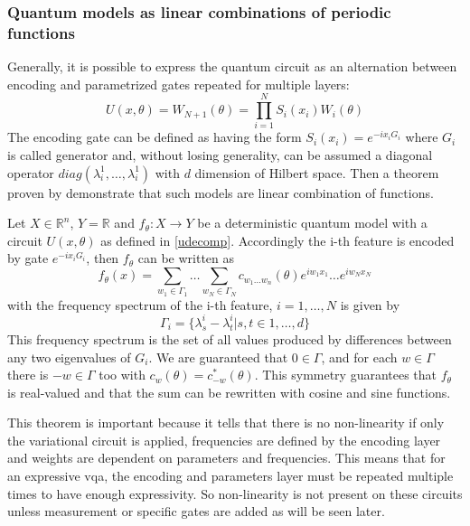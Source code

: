 \subsubsection{Quantum models as linear combinations of periodic functions}
Generally, it is possible to express the quantum circuit as an alternation between encoding and parametrized gates repeated for multiple layers:
\begin{equation}\label{udecomp}
	U(x,\theta) = W_{N+1}(\theta) = \prod_{i = 1}^{N} S_i(x_i)W_i(\theta)
\end{equation}
The encoding gate can be defined as having the form $S_i(x_i) = e^{-i x_i G_i} $ where $G_i$ is called generator and, without losing generality, can be assumed a diagonal operator $diag(\lambda_{i}^{1}, \dots, \lambda_{i}^{1} )$ with $d$ dimension of Hilbert space. Then a theorem proven by \cite{Schuld_theorem} demonstrate that such models are linear combination of functions.
\begin{theorem}
	Let $X \in \mathbb{R}^n$, $Y = \mathbb{R}$ and $f_\theta:X \to Y$ be a deterministic quantum model with a circuit $U(x,\theta)$ as defined in \ref{udecomp}. Accordingly the i-th  feature is encoded by gate $ e^{-i x_i G_i}$, then $f_\theta$ can be written as 
	\begin{equation*}
		f_\theta(x) = \sum_{w_1 \in \Gamma_1} \dots \sum_{w_N \in \Gamma_N} c_{w_1 \dots w_n}(\theta) e^{iw_1 x_1} \dots e^{iw_N x_N}
	\end{equation*}
	with the frequency spectrum of the i-th feature, $i=1,\dots,N$ is given by 
	\begin{equation*}
		\Gamma_i = \{\lambda_{s}^{i} - \lambda_{t}^{i} | s, t \in {1, \dots,d} \}
	\end{equation*}
	This frequency spectrum is the set of all values produced by differences between
	any two eigenvalues of $G_i$. We are guaranteed that $0\in\Gamma$, and for each $w \in \Gamma$	there is $-w \in \Gamma$ too with $c_w(\theta) = c_{-w}^{*}(\theta)$. This symmetry guarantees that $f_\theta$ is real-valued and that the sum can be rewritten with cosine and sine functions.
\end{theorem}
This theorem is important because it tells that there is no non-linearity if only the variational circuit is applied, frequencies are defined by the encoding layer and weights are dependent on parameters and frequencies. This means that for an expressive \acrlong{vqa}, the encoding and parameters layer must be repeated multiple times to have enough expressivity.
So non-linearity is not present on these circuits unless measurement or specific gates are added as will be seen later.
